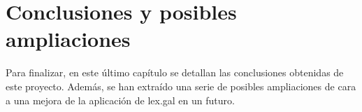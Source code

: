 \chapter{Conclusiones y posibles ampliaciones}

Para finalizar, en este último capítulo se detallan las conclusiones obtenidas de este proyecto. Además, se han extraído una serie de posibles ampliaciones de cara a una mejora de la aplicación de lex.gal en un futuro.


